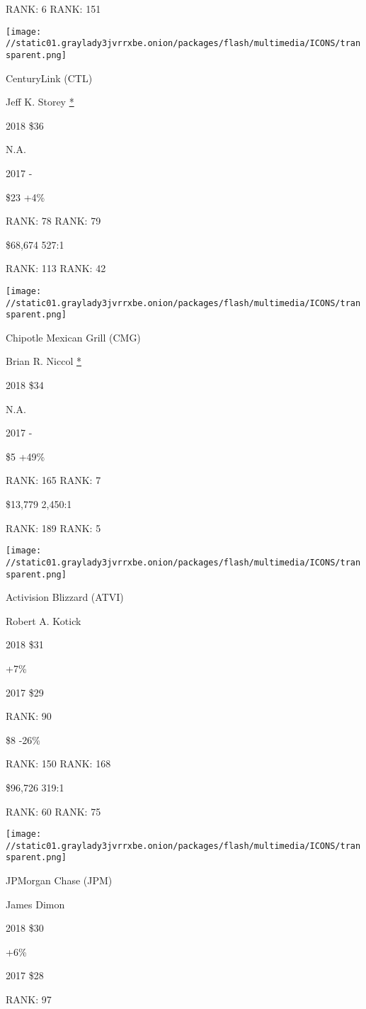 RANK: 6 RANK: 151

\texttt{[image: //static01.graylady3jvrrxbe.onion/packages/flash/multimedia/ICONS/transparent.png]}

CenturyLink (CTL)

Jeff K. Storey \protect\hyperlink{g-footnotes}{*}

2018 \$36

 N.A.

2017 -

 \$23 +4\%

RANK: 78 RANK: 79

 \$68,674 527:1

RANK: 113 RANK: 42

\texttt{[image: //static01.graylady3jvrrxbe.onion/packages/flash/multimedia/ICONS/transparent.png]}

Chipotle Mexican Grill (CMG)

Brian R. Niccol \protect\hyperlink{g-footnotes}{*}

2018 \$34

 N.A.

2017 -

 \$5 +49\%

RANK: 165 RANK: 7

 \$13,779 2,450:1

RANK: 189 RANK: 5

\texttt{[image: //static01.graylady3jvrrxbe.onion/packages/flash/multimedia/ICONS/transparent.png]}

Activision Blizzard (ATVI)

Robert A. Kotick \protect\hyperlink{g-footnotes}{}

2018 \$31

 +7\%

2017 \$29

RANK: 90

 \$8 -26\%

RANK: 150 RANK: 168

 \$96,726 319:1

RANK: 60 RANK: 75

\texttt{[image: //static01.graylady3jvrrxbe.onion/packages/flash/multimedia/ICONS/transparent.png]}

JPMorgan Chase (JPM)

James Dimon \protect\hyperlink{g-footnotes}{}

2018 \$30

 +6\%

2017 \$28

RANK: 97

